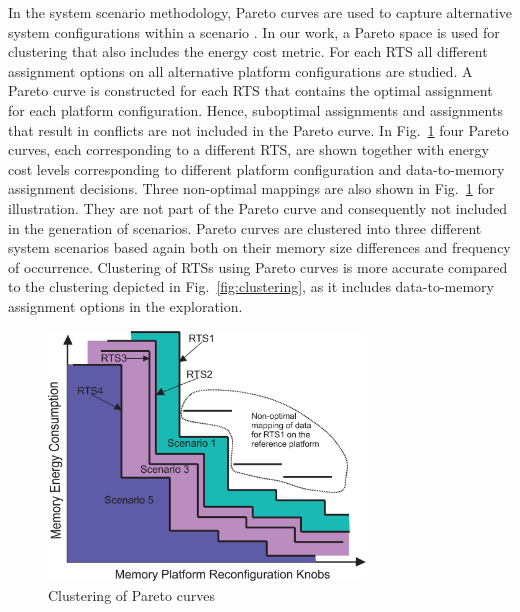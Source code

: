 \documentclass[smallcondensed]{svjour3}
\begin{document}
In the system scenario methodology, Pareto curves are used to capture alternative system configurations within a scenario \cite{tcm}. 
In our work, a Pareto space is used for clustering that also includes the energy cost metric. 
For each RTS all different assignment options on all alternative platform configurations are studied. 
A Pareto curve is constructed for each RTS that contains the optimal assignment for each platform configuration. 
Hence, suboptimal assignments and assignments that result in conflicts are not included in the Pareto curve. 
In Fig.~\ref{fig:pareto} four Pareto curves, each corresponding to a different RTS, are shown together with energy cost levels corresponding to different platform configuration and data-to-memory assignment decisions. 
Three non-optimal mappings are also shown in Fig.~\ref{fig:pareto} for illustration. 
They are not part of the Pareto curve and consequently not included in the generation of scenarios. 
Pareto curves are clustered into three different system scenarios based again both on their memory size differences and frequency of occurrence. 
Clustering of RTSs using Pareto curves is more accurate compared to the clustering depicted in Fig.~\ref{fig:clustering}, as it includes data-to-memory assignment options in the exploration. 

\begin{figure}
\centering
\includegraphics[width=0.75\textwidth]{Images/2DClustering.eps}
\caption{Clustering of Pareto curves}
\label{fig:pareto}
\end{figure}
\end{document}
